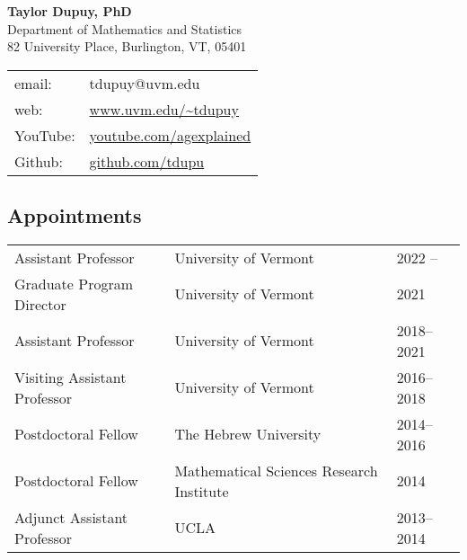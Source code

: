 \documentclass[a4paper,10pt]{article}
\begin{document}

\begin{multicols}{2}
\begin{flushleft}
    {\Large \bf Taylor Dupuy, PhD}\\
	Department of Mathematics and Statistics \\
	82 University Place, Burlington, VT, 05401  
	\newline \newline
	\begin{tabular}{ll}
		email: & tdupuy@uvm.edu\\
		web: & \url{www.uvm.edu/~tdupuy}\\
		YouTube: & \url{youtube.com/agexplained} \\
		Github: & \url{github.com/tdupu} 
	\end{tabular}
\end{flushleft}
\end{multicols}

 
 
 \subsection*{Appointments}
 \vspace*{-10pt}
\begin{center}
\begin{tabular}{p{1.7in} p{3.5in}p{1in}}
Assistant Professor & University of Vermont & 2022 -- \\
Graduate Program Director & University of Vermont & 2021 \\
Assistant Professor & University of Vermont & 2018--2021 \\
Visiting Assistant Professor & University of Vermont & 2016--2018 \\
Postdoctoral Fellow & The Hebrew University& 2014--2016 \\
Postdoctoral Fellow & Mathematical Sciences Research Institute & 2014 \\
Adjunct Assistant Professor & UCLA & 2013--2014 \\
\end{tabular}
\end{center}
\end{document}
